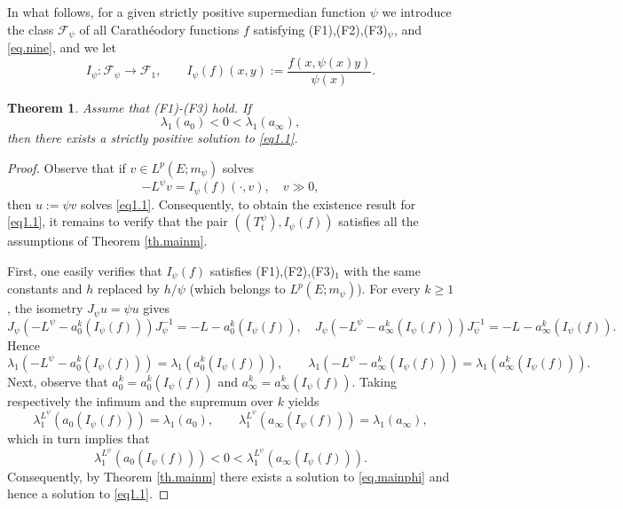 \documentclass[11pt,a4paper,reqno]{amsart}
\newtheorem{theorem}{\bf Theorem}[section]
\theoremstyle{definition}
\numberwithin{equation}{section}
\begin{document}
In what follows, for a given strictly positive supermedian function $\psi$ we introduce  the class  $\mathscr  F_\psi$
of all Carath\'eodory functions $f$ satisfying (F1),(F2),(F3)$_\psi$, and \eqref{eq.nine}, and we let 
\[
I_\psi:\mathscr F_\psi\longrightarrow\mathscr F_1,
\qquad
I_\psi(f)(x,y):=\frac{f(x,\psi(x)y)}{\psi(x)}.
\]



\begin{theorem}
\label{th.main}
Assume that (F1)-(F3) hold. If 
\begin{equation}
\label{eq.nine}
\lambda_1(a_0)<0< \lambda_1(a_\infty),
\end{equation}
then there exists a  strictly positive solution to \eqref{eq1.1}.
\end{theorem}
\begin{proof}
Observe that if $v\in L^p(E;m_\psi)$ solves 
\begin{equation}
\label{eq.mainphi}
-L^{\psi}v=I_\psi(f)(\cdot,v),\quad v\gg 0,
\end{equation}
then $u:= \psi v$ solves \eqref{eq1.1}.
Consequently, to obtain the existence result  for \eqref{eq1.1}, it remains to verify that the pair   $((T^{\psi}_t), I_\psi(f))$ 
satisfies all the assumptions of Theorem \ref{th.mainm}.


First, one easily verifies that $I_\psi(f)$ satisfies (F1),(F2),(F3)$_1$ with the same constants and $h$ 
replaced by $h/\psi$ (which belongs to $L^p(E;m_\psi)$).
For every $k\ge1$, the isometry $J_\psi u=\psi u$ gives
\[
J_\psi(-L^\psi-a_0^k(I_\psi(f)))J_\psi^{-1}=-L-a_0^k(I_\psi(f)),
\quad
J_\psi(-L^\psi-a_\infty^k(I_\psi(f)))J_\psi^{-1}=-L-a_\infty^k(I_\psi(f)).
\]
Hence
\[
\lambda_1(-L^\psi-a_0^k(I_\psi(f)))=\lambda_1(a_0^k(I_\psi(f))),
\qquad
\lambda_1(-L^\psi-a_\infty^k(I_\psi(f)))=\lambda_1(a_\infty^k(I_\psi(f))).
\]
Next, observe that $ a^k_0=a^k_0(I_\psi(f))$ and $ a^k_\infty=a^k_\infty(I_\psi(f))$.
Taking respectively the infimum and the supremum over $k$ yields
\[
\lambda_1^{L^\psi}(a_0(I_\psi(f)))=\lambda_1(a_0),
\qquad
\lambda_1^{L^\psi}(a_\infty(I_\psi(f)))=\lambda_1(a_\infty),
\]
which in turn implies that
\[
\lambda_1^{L^\psi}(a_0(I_\psi(f)))<0<\lambda_1^{L^\psi}(a_\infty(I_\psi(f))).
\]
Consequently, by Theorem \ref{th.mainm} there exists a solution to \eqref{eq.mainphi} and hence a solution to \eqref{eq1.1}.
\end{proof}
\end{document}
